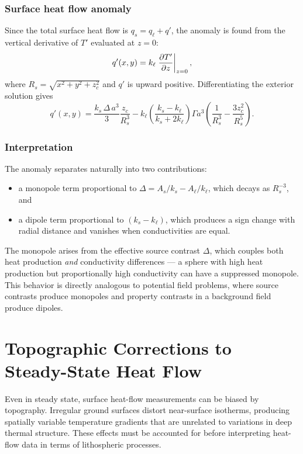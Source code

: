 \subsubsection*{Surface heat flow anomaly}

Since the total surface heat flow is $q_s = q_\ell + q'$, the anomaly is found from the vertical derivative of $T'$ evaluated at $z = 0$:
\[
    q'(x,y) = k_\ell \eval{\pdv{T'}{z}}_{z=0},
\]
where $R_s = \sqrt{x^2 + y^2 + z_c^2}$ and $q'$ is upward positive.  Differentiating the exterior solution gives
\[
    q'(x,y)
    =
    \frac{k_s\,\Delta\,a^3}{3}\frac{z_c}{R_s^3}
    -
    k_\ell \left(\frac{k_s - k_\ell}{k_s + 2k_\ell}\right)
    \Gamma a^3
    \left(
        \frac{1}{R_s^3}
        - \frac{3 z_c^2}{R_s^5}
    \right).
\]

\subsubsection*{Interpretation}

The anomaly separates naturally into two contributions:
\begin{itemize}
    \item a monopole term proportional to $\Delta = A_s/k_s - A_\ell/k_\ell$, which decays as $R_s^{-3}$, and
    \item a dipole term proportional to $(k_s - k_\ell)$, which produces a sign change with radial distance and vanishes when conductivities are equal.
\end{itemize}
The monopole arises from the effective source contrast $\Delta$, which couples both heat production \emph{and} conductivity differences — a sphere with high heat production but proportionally high conductivity can have a suppressed monopole.  This behavior is directly analogous to potential field problems, where source contrasts produce monopoles and property contrasts in a background field produce dipoles.

\section{Topographic Corrections to Steady-State Heat Flow}

Even in steady state, surface heat-flow measurements can be biased by topography.  Irregular ground surfaces distort near-surface isotherms, producing spatially variable temperature gradients that are unrelated to variations in deep thermal structure. These effects must be accounted for before interpreting heat-flow data in terms of lithospheric processes.

